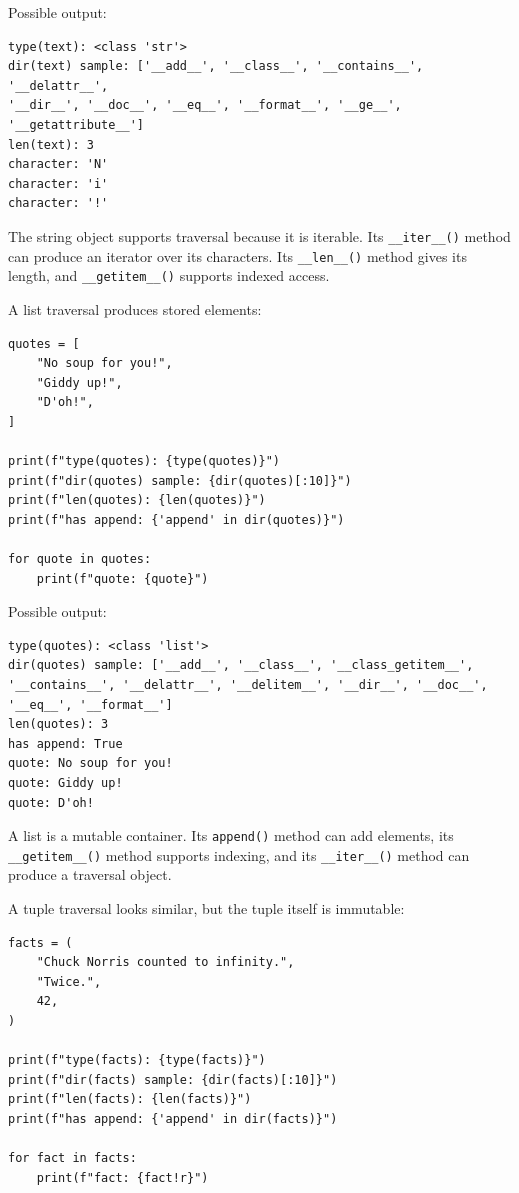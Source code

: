 Possible output:

\begin{verbatim}
type(text): <class 'str'>
dir(text) sample: ['__add__', '__class__', '__contains__', '__delattr__',
'__dir__', '__doc__', '__eq__', '__format__', '__ge__', '__getattribute__']
len(text): 3
character: 'N'
character: 'i'
character: '!'
\end{verbatim}

The string object supports traversal because it is iterable. Its \texttt{\_\_iter\_\_()} method can produce an iterator over its characters. Its \texttt{\_\_len\_\_()} method gives its length, and \texttt{\_\_getitem\_\_()} supports indexed access.

A list traversal produces stored elements:

\begin{verbatim}
quotes = [
    "No soup for you!",
    "Giddy up!",
    "D'oh!",
]

print(f"type(quotes): {type(quotes)}")
print(f"dir(quotes) sample: {dir(quotes)[:10]}")
print(f"len(quotes): {len(quotes)}")
print(f"has append: {'append' in dir(quotes)}")

for quote in quotes:
    print(f"quote: {quote}")
\end{verbatim}

Possible output:

\begin{verbatim}
type(quotes): <class 'list'>
dir(quotes) sample: ['__add__', '__class__', '__class_getitem__',
'__contains__', '__delattr__', '__delitem__', '__dir__', '__doc__',
'__eq__', '__format__']
len(quotes): 3
has append: True
quote: No soup for you!
quote: Giddy up!
quote: D'oh!
\end{verbatim}

A list is a mutable container. Its \texttt{append()} method can add elements, its \texttt{\_\_getitem\_\_()} method supports indexing, and its \texttt{\_\_iter\_\_()} method can produce a traversal object.

A tuple traversal looks similar, but the tuple itself is immutable:

\begin{verbatim}
facts = (
    "Chuck Norris counted to infinity.",
    "Twice.",
    42,
)

print(f"type(facts): {type(facts)}")
print(f"dir(facts) sample: {dir(facts)[:10]}")
print(f"len(facts): {len(facts)}")
print(f"has append: {'append' in dir(facts)}")

for fact in facts:
    print(f"fact: {fact!r}")
\end{verbatim}

